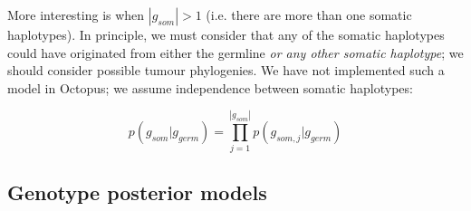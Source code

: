 \documentclass[notitlepage, twocolumn]{article}
\begin{document}
More interesting is when $|g_{som}| > 1$ (i.e. there are more than one somatic haplotypes). In principle, we must consider that any of the somatic haplotypes could have originated from either the germline \emph{or any other somatic haplotype}; we should consider possible tumour phylogenies. We have not implemented such a model in Octopus; we assume independence between somatic haplotypes:

\begin{equation*}
p(g_{som} | g_{germ}) = \prod_{j = 1}^{|g_{som}|} p(g_{som,j} | g_{germ})
\end{equation*}

\subsection*{Genotype posterior models}
\end{document}
